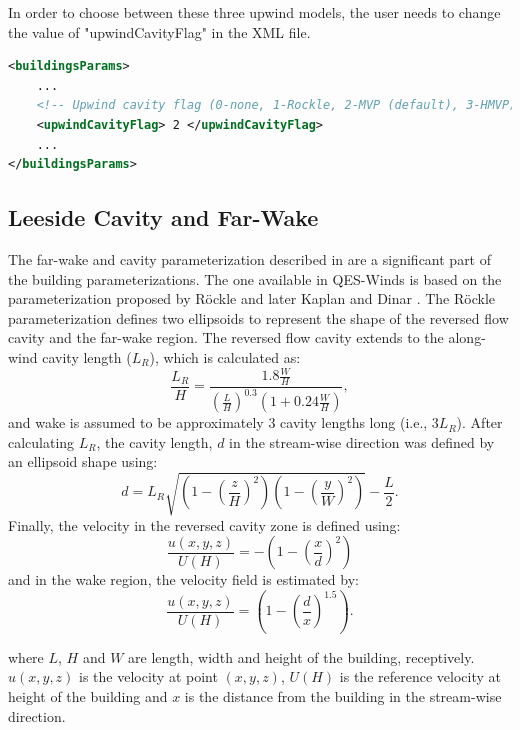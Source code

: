 In order to choose between these three upwind models, the user needs to change the value of "upwindCavityFlag" in the XML file.


\begin{lstlisting}[language=XML]
<buildingsParams>
	...
	<!-- Upwind cavity flag (0-none, 1-Rockle, 2-MVP (default), 3-HMVP) -->
	<upwindCavityFlag> 2 </upwindCavityFlag> 	
	...		
</buildingsParams>
\end{lstlisting}

\subsection{Leeside Cavity and Far-Wake}\label{leeside-cavity-and-far-wake}

The far-wake and cavity parameterization described in \cite{singh2005testing,singh2006testing} are a significant part of the building parameterizations. The one available in QES-Winds is based on the parameterization proposed by R\"{o}ckle \cite{rockle1990bestimmung} and later Kaplan and Dinar \cite{kaplan1996lagrangian}. The R\"{o}ckle parameterization defines two ellipsoids to represent the shape of the reversed flow cavity and the far-wake region. The reversed flow cavity extends to the along-wind cavity length
($L_R$), which is calculated as:
\begin{equation}
\frac{L_{R}}{H}=\frac{1.8 \frac{W}{H}}{\left(\frac{L}{H}\right)^{0.3}\left(1+0.24 \frac{W}{H}\right)},
\label{eq:Lr}
\end{equation}
and wake is assumed to be approximately $3$ cavity lengths long (i.e., $3L_R$). After calculating $L_R$, the cavity length, $d$ in the stream-wise direction was defined by an ellipsoid shape using: 
\begin{equation}
d=L_{R} \sqrt{\left(1-\left(\frac{z}{H}\right)^{2}\right)\left(1-\left(\frac{y}{W}\right)^{2}\right)}-\frac{L}{2}.
\label{eq:d}
\end{equation} 
Finally, the velocity in the reversed cavity zone is defined using:
\begin{equation}
\frac{u(x, y, z)}{U(H)}=-\left(1-\left(\frac{x}{d}\right)^{2}\right)
\label{eq:cavity}
\end{equation}
and in the wake region, the velocity field is estimated by: 
\begin{equation}
\frac{u(x, y, z)}{U(H)}=\left(1-\left(\frac{d}{x}\right)^{1.5}\right).
\label{eq:wake}
\end{equation}

where $L$, $H$ and $W$ are length, width and height of the building, receptively. $u(x,y,z)$ is the velocity at point $(x,y,z)$, $U(H)$ is the reference velocity at height of the building and $x$ is the distance from the building in the stream-wise direction.

